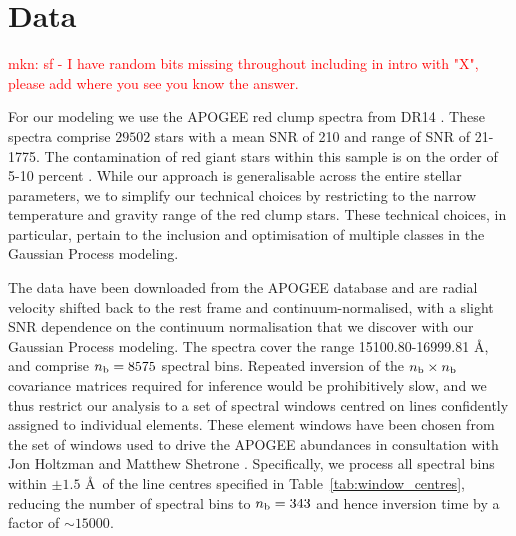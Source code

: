 \documentclass[a4paper,fleqn,usenatbib]{mnras}
\newcommand{\nb}{n_{\rm b}}
\begin{document}
\section{Data} 

\textcolor{red}{mkn: sf  - I have random bits missing throughout including in intro with "X", please add where you see you know the answer.}

For our modeling we use the APOGEE red clump spectra from DR14 \citep{Majewski2017, Bovy2015}. These spectra comprise $29502$ stars with a mean SNR of 210 and range of SNR of 21-1775.  The contamination of red giant stars within this sample is on the order of 5-10 percent \citep{Bovy2015}. While our approach is generalisable across the entire stellar parameters, we to simplify our technical choices by restricting to the narrow temperature and gravity range of the red clump stars. These technical choices, in particular,  pertain to the inclusion and optimisation of multiple classes in the Gaussian Process modeling.


The data have been downloaded from the APOGEE database and are radial velocity shifted back to the rest frame and continuum-normalised, with a slight SNR dependence on the continuum normalisation that we discover with our Gaussian Process modeling. The spectra cover the range 15100.80-16999.81 \AA, and comprise $\nb = 8575$ spectral bins. Repeated inversion of the $\nb \times \nb$ covariance matrices required for inference would be prohibitively slow, and we thus restrict our analysis to a set of spectral windows centred on lines confidently assigned to individual elements. These element windows have been chosen from the set of windows used to drive the APOGEE abundances in consultation with Jon Holtzman and Matthew Shetrone \citep{Holtzman2015, Shetrone2015}. Specifically, we process all spectral bins within $\pm 1.5$ \AA\ of the line centres specified in Table~\ref{tab:window_centres}, reducing the number of spectral bins to $\nb = 343$ and hence inversion time by a factor of $\sim15000$. %
\end{document}
